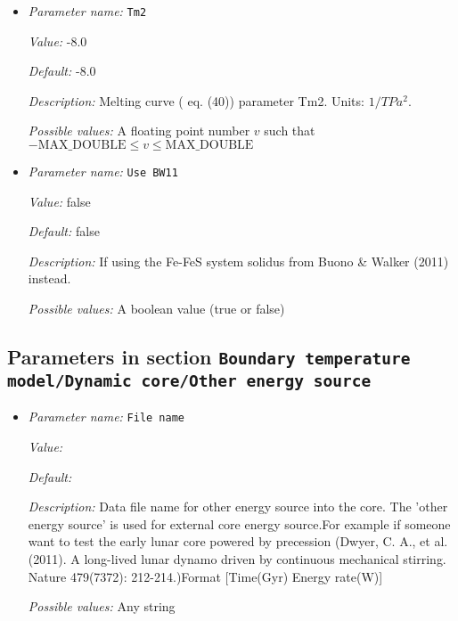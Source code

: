 \begin{itemize}
{\it Possible values:} A floating point number $v$ such that $-\text{MAX\_DOUBLE} \leq v \leq \text{MAX\_DOUBLE}$
\item {\it Parameter name:} {\tt Tm2}
\label{parameters:Boundary temperature model/Dynamic core/Geotherm parameters/Tm2}


{\it Value:} -8.0


{\it Default:} -8.0


{\it Description:} Melting curve (\cite{NPB+04} eq. (40)) parameter Tm2. Units: $1/TPa^2$.


{\it Possible values:} A floating point number $v$ such that $-\text{MAX\_DOUBLE} \leq v \leq \text{MAX\_DOUBLE}$
\item {\it Parameter name:} {\tt Use BW11}
\label{parameters:Boundary temperature model/Dynamic core/Geotherm parameters/Use BW11}


{\it Value:} false


{\it Default:} false


{\it Description:} If using the Fe-FeS system solidus from Buono \& Walker (2011) instead.


{\it Possible values:} A boolean value (true or false)
\end{itemize}

\subsection{Parameters in section \tt Boundary temperature model/Dynamic core/Other energy source}
\label{parameters:Boundary_20temperature_20model/Dynamic_20core/Other_20energy_20source}

\begin{itemize}
\item {\it Parameter name:} {\tt File name}
\label{parameters:Boundary temperature model/Dynamic core/Other energy source/File name}


{\it Value:} 


{\it Default:} 


{\it Description:} Data file name for other energy source into the core. The 'other energy source' is used for external core energy source.For example if someone want to test the early lunar core powered by precession (Dwyer, C. A., et al. (2011). A long-lived lunar dynamo driven by continuous mechanical stirring. Nature 479(7372): 212-214.)Format [Time(Gyr)   Energy rate(W)]


{\it Possible values:} Any string
\end{itemize}

